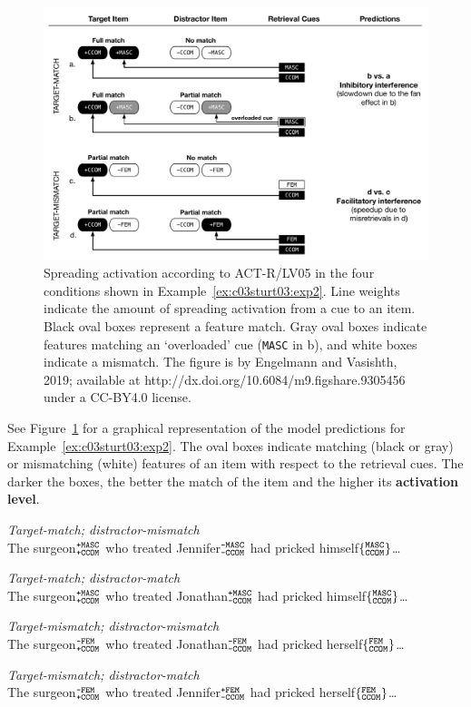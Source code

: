 \documentclass{cambridge7A}\usepackage[]{graphicx}\usepackage[]{color}
\newcommand{\actrcue}[1]{\texttt{\uppercase{#1}}}
\newcommand{\featureset}[2]{$\{^{\texttt{\uppercase{#1}}}_{\texttt{\uppercase{#2}}}\}$}
\newcommand{\featuresetNP}[2]{$^{\texttt{\uppercase{#1}}}_{\texttt{\uppercase{#2}}}$}
\begin{document}
\begin{figure}[!htbp]
\includegraphics[width=\textwidth]{figures/tableLV05pred}
    \caption{Spreading activation according to ACT-R/LV05 in the four conditions shown in Example~\ref{ex:c03sturt03:exp2}. Line weights indicate the amount of spreading activation from a cue to an item. Black oval boxes represent a feature match. Gray oval boxes indicate features matching an `overloaded' cue (\actrcue{MASC} in b), and white boxes indicate a mismatch. The figure is by Engelmann and Vasishth, 2019; available at http://dx.doi.org/10.6084/m9.figshare.9305456 under a CC-BY4.0 license.}\label{fig:c03ACTRpred}
\end{figure}


See Figure~\ref{fig:c03ACTRpred} for a graphical representation of the model predictions for Example~\ref{ex:c03sturt03:exp2}. The oval boxes indicate matching (black or gray) or mismatching (white) features of an item with respect to the retrieval cues. The darker the boxes, the better the match of the item and the higher its \textbf{activation level}.

\begin{exe}
\ex\label{ex:c03sturt03:exp2}
\begin{xlist}
\item \textit{Target-match; distractor-mismatch}\\
The surgeon\featuresetNP{+MASC}{+CCOM} who treated Jennifer\featuresetNP{-MASC}{-CCOM} had pricked himself\featureset{MASC}{CCOM}\dots
\item \textit{Target-match; distractor-match}\\
The surgeon\featuresetNP{+MASC}{+CCOM} who treated Jonathan\featuresetNP{+MASC}{-CCOM} had pricked himself\featureset{MASC}{CCOM}\dots
\item \textit{Target-mismatch; distractor-mismatch}\\
The surgeon\featuresetNP{-FEM}{+CCOM} who treated Jonathan\featuresetNP{-FEM}{-CCOM} had pricked herself\featureset{FEM}{CCOM}\dots
\item \textit{Target-mismatch; distractor-match}\\
The surgeon\featuresetNP{-FEM}{+CCOM} who treated Jennifer\featuresetNP{+FEM}{-CCOM} had pricked herself\featureset{FEM}{CCOM}\dots
\end{xlist}
\end{exe}
\end{document}
